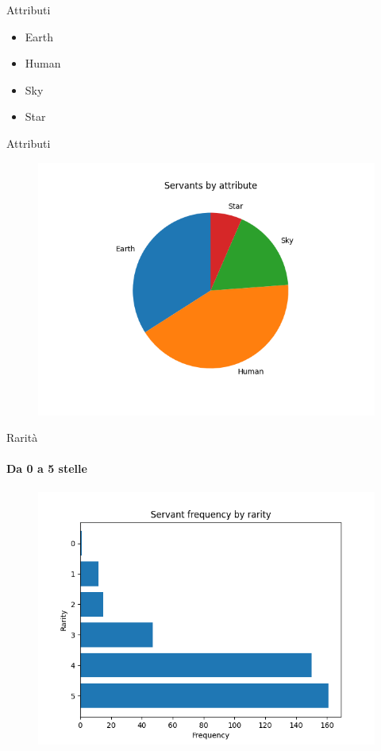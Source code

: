 \documentclass{beamer}
\begin{document}
\begin{darkframes}
  \begin{frame}{Attributi}
    \begin{itemize}
      \item Earth
      \item Human
      \item Sky
      \item Star
    \end{itemize}
  \end{frame}

  \begin{frame}{Attributi}
    \begin{figure}
      \centering
      \includegraphics[scale=0.55]{./images/frequency_by_attribute.png}
    \end{figure}
  \end{frame}

  \begin{frame}{Rarità}
    \framesubtitle{Da 0 a 5 stelle}
    \begin{figure}
      \centering
      \includegraphics[scale=0.55]{./images/frequency_by_rarity.png}
    \end{figure}
  \end{frame}


\end{darkframes}
\end{document}
